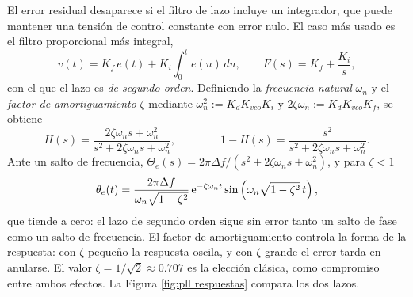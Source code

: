 El error residual desaparece si el filtro de lazo incluye un integrador, que puede mantener una tensión de control constante con error nulo. El caso más usado es el filtro proporcional más integral,
\begin{equation*}
    v(t) = K_f\, e(t) + K_i\int_0^t e(u)\,du, \qquad F(s) = K_f + \frac{K_i}{s},
\end{equation*}
con el que el lazo es \emph{de segundo orden}. Definiendo la \emph{frecuencia natural} $\omega_n$ y el \emph{factor de amortiguamiento} $\zeta$ mediante $\omega_n^2 := K_dK_{vco}K_i$ y $2\zeta\omega_n := K_dK_{vco}K_f$, se obtiene
\begin{equation}\label{eq:pll segundo orden}
    H(s) = \frac{2\zeta\omega_n s+\omega_n^2}{s^2+2\zeta\omega_n s+\omega_n^2}, \qquad\qquad 1-H(s) = \frac{s^2}{s^2+2\zeta\omega_n s+\omega_n^2}.
\end{equation}
Ante un salto de frecuencia, $\Theta_e(s)=2\pi\Delta f/(s^2+2\zeta\omega_n s+\omega_n^2)$, y para $\zeta<1$
\begin{equation*}
    \theta_e(t) = \frac{2\pi\Delta f}{\omega_n\sqrt{1-\zeta^2}}\,\mathrm{e}^{-\zeta\omega_n t}\sin\left(\omega_n\sqrt{1-\zeta^2}\,t\right),
\end{equation*}
que tiende a cero: el lazo de segundo orden sigue sin error tanto un salto de fase como un salto de frecuencia. El factor de amortiguamiento controla la forma de la respuesta: con $\zeta$ pequeño la respuesta oscila, y con $\zeta$ grande el error tarda en anularse. El valor $\zeta=1/\sqrt 2\approx 0.707$ es la elección clásica, como compromiso entre ambos efectos. La Figura \ref{fig:pll respuestas} compara los dos lazos.

